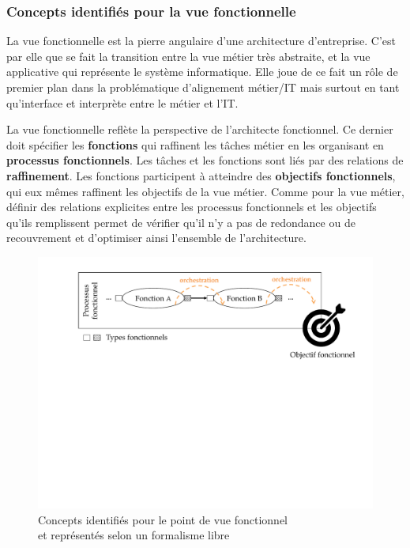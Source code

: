     \subsubsection{Concepts identifiés pour la vue fonctionnelle}

    La vue fonctionnelle est la pierre angulaire d'une architecture d'entreprise. C'est par elle que se fait la transition entre la vue métier très abstraite, et la vue applicative qui représente le système informatique.
    Elle joue de ce fait un rôle de premier plan dans la problématique d'alignement métier/IT mais surtout en tant
    qu'interface et interprète entre le métier et l'IT.

    La vue fonctionnelle reflète la perspective de l'architecte fonctionnel. Ce dernier doit spécifier les \textbf{fonctions}
    qui raffinent les tâches métier en les organisant en \textbf{processus fonctionnels}. Les tâches et les fonctions
    sont liés par des relations de \textbf{raffinement}.
    Les fonctions participent à atteindre des \textbf{objectifs fonctionnels}, qui eux mêmes raffinent les objectifs
    de la vue métier. Comme pour la vue métier, définir des relations explicites entre les processus fonctionnels
    et les objectifs qu'ils remplissent permet de vérifier qu'il n'y a pas de redondance ou de recouvrement
    et d'optimiser ainsi l'ensemble de l'architecture.

    \begin{figure}[!ht]
     \centering
     \includegraphics[trim= 0cm 11cm 0cm 0cm, clip,width=1\textwidth]{figures/4_demarche/concepts_vue_fonctionnelle.pdf}
     \caption{Concepts identifiés pour le point de vue fonctionnel \\
              et représentés selon un formalisme libre}
     \label{fig:concepts_vue_fonctionnelle}
    \end{figure}

